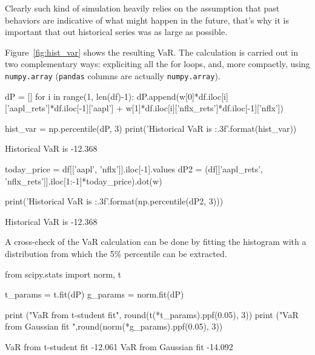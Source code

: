 Clearly such kind of simulation heavily relies on the assumption that past behaviors are indicative of what might happen in the future, that's why it is important that out historical series was as large as possible.


Figure~\ref{fig:hist_var} shows the resulting VaR. The calculation is carried out in two complementary ways: expliciting all the for loops, and, more compactly, using \texttt{numpy.array} (\texttt{pandas} columns are actually \texttt{numpy.array}).

\begin{ipython}
dP = []
for i in range(1, len(df)-1):
    dP.append(w[0]*df.iloc[i]['aapl_rets']*df.iloc[-1]['aapl'] + 
              w[1]*df.iloc[i]['nflx_rets']*df.iloc[-1]['nflx'])

hist_var = np.percentile(dP, 3)
print('Historical VaR is {:.3f}'.format(hist_var))
\end{ipython}
\begin{ioutput}
Historical VaR is -12.368
\end{ioutput}

\begin{ipython}
today_price = df[['aapl', 'nflx']].iloc[-1].values
dP2 = (df[['aapl_rets', 'nflx_rets']].iloc[1:-1]*today_price).dot(w)

print('Historical VaR is {:.3f}'.format(np.percentile(dP2, 3)))
\end{ipython}
\begin{ioutput}
Historical VaR is -12.368
\end{ioutput}

A cross-check of the VaR calculation can be done by fitting the histogram with a distribution from which the 5\% percentile can be extracted.

\begin{ipython}
from scipy.stats import norm, t

t_params = t.fit(dP) 
g_params = norm.fit(dP)

print ("VaR from t-student fit", round(t(*t_params).ppf(0.05), 3))
print ("VaR from Gaussian fit ",round(norm(*g_params).ppf(0.05), 3))
\end{ipython}
\begin{ioutput}
VaR from t-student fit -12.061
VaR from Gaussian fit  -14.092
\end{ioutput}

